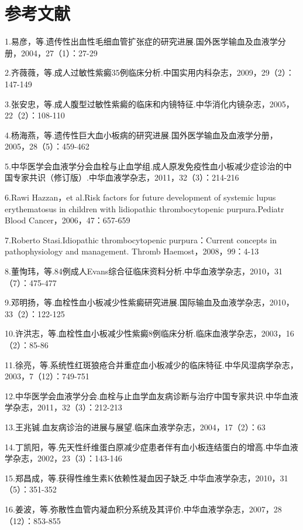 \protect\hypertarget{text00268.html}{}{}

\section{参考文献}

1.易彦，等.遗传性出血性毛细血管扩张症的研究进展.国外医学输血及血液学分册，2004，27（1）：27-29

2.齐薇薇，等.成人过敏性紫癜35例临床分析.中国实用内科杂志，2009，29（2）：147-149

3.张安忠，等.成人腹型过敏性紫癜的临床和内镜特征.中华消化内镜杂志，2005，22（2）：108-110

4.杨海燕，等.遗传性巨大血小板病的研究进展.国外医学输血及血液学分册，2005，28（5）：459-462

5.中华医学会血液学分会血栓与止血学组.成人原发免疫性血小板减少症诊治的中国专家共识（修订版）.中华血液学杂志，2011，32（3）：214-216

6.Rawi Hazzan，et al.Risk factors for future development of systemic
lupus erythematosus in children with lidiopathic thrombocytopenic
purpura.Pediatr Blood Cancer，2006，47：657-659

7.Roberto Stasi.Idiopathic thrombocytopenic purpura：Current concepts in
pathophysiology and management. Thromb Haemost，2008，99：4-13

8.董恂玮，等.84例成人Evans综合征临床资料分析.中华血液学杂志，2010，31（7）：475-477

9.邓明扬，等.血栓性血小板减少性紫癜研究进展.国际输血及血液学杂志，2010，33（2）：122-125

10.许洪志，等.血栓性血小板减少性紫癜8例临床分析.临床血液学杂志，2003，16（2）：85-86

11.徐亮，等.系统性红斑狼疮合并重症血小板减少的临床特征.中华风湿病学杂志，2003，7（12）：749-751

12.中华医学会血液学分会.血栓与止血学血友病诊断与治疗中国专家共识.中华血液学杂志，2011，32（3）：212-213

13.王兆铖.血友病诊治的进展与展望.临床血液学杂志，2004，17（2）：63

14.丁凯阳，等.先天性纤维蛋白原减少症患者伴有血小板连结蛋白的增高.中华血液学杂志，2002，23（3）：143-146

15.郑昌成，等.获得性维生素K依赖性凝血因子缺乏.中华血液学杂志，2010，31（5）：351-352

16.姜波，等.弥散性血管内凝血积分系统及其评价.中华血液学杂志，2007，28（12）：853-855

\protect\hypertarget{text00269.html}{}{}

